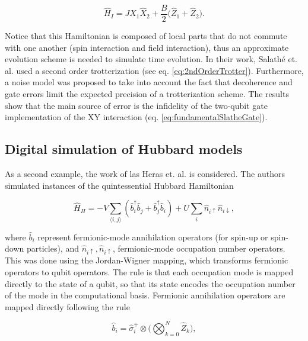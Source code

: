     \begin{equation}
      \hat{H}_I = J \hat{X}_1 \hat{X}_2 + \frac{B}{2}\bigg(\hat{Z}_1 + \hat{Z}_2 \bigg).
      \label{eq:IsingSlathe}
    \end{equation}

    Notice that this Hamiltonian is composed of local parts that do not commute with one another (spin interaction and field interaction), thus an approximate evolution scheme is needed to simulate time evolution. In their work, Salathé et. al. \cite{HeisenbergSimulLasHeras} used a second order trotterization (see eq. \ref{eq:2ndOrderTrotter}). Furthermore, a noise model was proposed to take into account the fact that decoherence and gate errors limit the expected precision of a trotterization scheme. The results show that the main source of error is the infidelity of the two-qubit gate implementation of the XY interaction (eq. \ref{eq:fundamentalSlatheGate}).

  \subsection{Digital simulation of Hubbard models}
  \label{subsec:HubbardModels}

    As a second example, the work of las Heras et. al. is considered\cite{HubbardSimulLasHeras}. The authors simulated instances of the quintessential Hubbard Hamiltonian

    \begin{equation}
      \hat{H}_H = -V \sum_{\langle i,j\rangle} (\hat{b}_i^{\dagger}\hat{b}_j + \hat{b}_j^{\dagger}\hat{b}_i) + U \sum_i \hat{n}_{i\uparrow}\hat{n}_{i\downarrow},
      \label{eq:HubbardHamiltonian}
    \end{equation}

    \noindent where $\hat{b}_i$ represent fermionic-mode annihilation operators (for spin-up or spin-down particles), and $\hat{n}_{i\uparrow},\hat{n}_{i\uparrow}$, fermionic-mode occupation number operators. This was done using the Jordan-Wigner mapping, which transforms fermionic operators to qubit operators. The rule is that each occupation mode is mapped directly to the state of a qubit, so that its state encodes the occupation number of the mode in the computational basis. Fermionic annihilation operators are mapped directly following the rule \cite{Mastersthesis}

    \begin{equation}
      \hat{b}_i = \hat{\sigma}_i^{+} \otimes \Bigg(\bigotimes_{k=0}^{N} \hat{Z}_k \Bigg),
      \label{eq:JWT}
    \end{equation}

